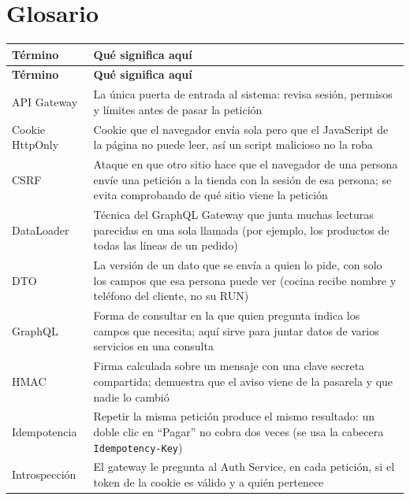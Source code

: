 
\section{Glosario}

{\small
\setlength{\tabcolsep}{3pt}\renewcommand{\arraystretch}{1.15}
\begin{longtable}{|>{\raggedright\arraybackslash}p{}|>{\raggedright\arraybackslash}p{}|}
\hline
\textbf{Término} & \textbf{Qué significa aquí} \\ \hline
\endfirsthead
\hline
\textbf{Término} & \textbf{Qué significa aquí} \\ \hline
\endhead
API Gateway & La única puerta de entrada al sistema: revisa sesión, permisos y límites antes de pasar la petición \\ \hline
Cookie HttpOnly & Cookie que el navegador envía sola pero que el JavaScript de la página no puede leer, así un script malicioso no la roba \\ \hline
CSRF & Ataque en que otro sitio hace que el navegador de una persona envíe una petición a la tienda con la sesión de esa persona; se evita comprobando de qué sitio viene la petición \\ \hline
DataLoader & Técnica del GraphQL Gateway que junta muchas lecturas parecidas en una sola llamada (por ejemplo, los productos de todas las líneas de un pedido) \\ \hline
DTO & La versión de un dato que se envía a quien lo pide, con solo los campos que esa persona puede ver (cocina recibe nombre y teléfono del cliente, no su RUN) \\ \hline
GraphQL & Forma de consultar en la que quien pregunta indica los campos que necesita; aquí sirve para juntar datos de varios servicios en una consulta \\ \hline
HMAC & Firma calculada sobre un mensaje con una clave secreta compartida; demuestra que el aviso viene de la pasarela y que nadie lo cambió \\ \hline
Idempotencia & Repetir la misma petición produce el mismo resultado: un doble clic en “Pagar” no cobra dos veces (se usa la cabecera \texttt{Idempotency-\allowbreak{}Key}) \\ \hline
Introspección & El gateway le pregunta al Auth Service, en cada petición, si el token de la cookie es válido y a quién pertenece \\ \hline

\end{longtable}}
